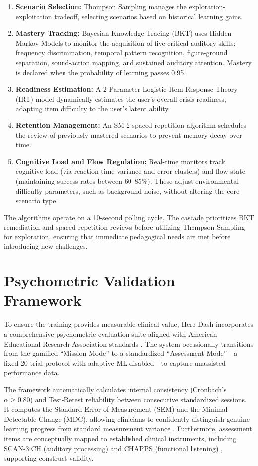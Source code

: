 \documentclass[conference]{IEEEtran}
\begin{document}
\begin{enumerate}
    \item \textbf{Scenario Selection:} Thompson Sampling manages the exploration-exploitation tradeoff, selecting scenarios based on historical learning gains.
    \item \textbf{Mastery Tracking:} Bayesian Knowledge Tracing (BKT) uses Hidden Markov Models to monitor the acquisition of five critical auditory skills: frequency discrimination, temporal pattern recognition, figure-ground separation, sound-action mapping, and sustained auditory attention. Mastery is declared when the probability of learning passes 0.95.
    \item \textbf{Readiness Estimation:} A 2-Parameter Logistic Item Response Theory (IRT) model dynamically estimates the user's overall crisis readiness, adapting item difficulty to the user's latent ability.
    \item \textbf{Retention Management:} An SM-2 spaced repetition algorithm schedules the review of previously mastered scenarios to prevent memory decay over time.
    \item \textbf{Cognitive Load and Flow Regulation:} Real-time monitors track cognitive load (via reaction time variance and error clusters) and flow-state (maintaining success rates between 60--85\%). These adjust environmental difficulty parameters, such as background noise, without altering the core scenario type.
\end{enumerate}

The algorithms operate on a 10-second polling cycle. The cascade prioritizes BKT remediation and spaced repetition reviews before utilizing Thompson Sampling for exploration, ensuring that immediate pedagogical needs are met before introducing new challenges.

\section{Psychometric Validation Framework}

To ensure the training provides measurable clinical value, Hero-Dash incorporates a comprehensive psychometric evaluation suite aligned with American Educational Research Association standards \cite{b10}. The system occasionally transitions from the gamified ``Mission Mode'' to a standardized ``Assessment Mode''---a fixed 20-trial protocol with adaptive ML disabled---to capture unassisted performance data.

The framework automatically calculates internal consistency (Cronbach's $\alpha \geq 0.80$) and Test-Retest reliability between consecutive standardized sessions. It computes the Standard Error of Measurement (SEM) and the Minimal Detectable Change (MDC), allowing clinicians to confidently distinguish genuine learning progress from standard measurement variance \cite{b12}. Furthermore, assessment items are conceptually mapped to established clinical instruments, including SCAN-3:CH (auditory processing) \cite{b13} and CHAPPS (functional listening) \cite{b14}, supporting construct validity. 
\end{document}
